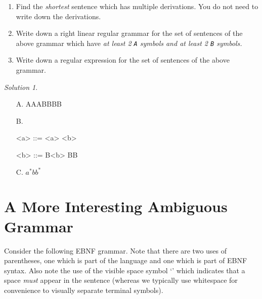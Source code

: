 \documentclass{article}
\theoremstyle{remark} \newtheorem*{solution}{Solution}
\begin{document}
\begin{enumerate}
\item
Find the \textit{shortest} sentence which has multiple
derivations. You do not need to write down the derivations.
\item
Write down a right linear regular grammar for the set of sentences of
the above grammar which have \textit{at least 2 \texttt{A} symbols and
  at least 2 \texttt{B} symbols.}
\item
Write down a regular expression for the set of sentences of the above
grammar.

\end{enumerate}
\begin{mdframed}
    \begin{solution}
        \begin{itemize}
        \indent
            \item [A.]
                AAABBBB
            \item[B.]
             \indent
                \begin{grammar}
                    <a> ::= <a> \alt {}<b>
                    
                    <b> ::= \lit*B<b> \alt \lit*B\lit*B
                \end{grammar}
            \item[C.]
                $a^{*}bb^{*}$
        \end{itemize}
    \end{solution}
\end{mdframed}

\pagebreak
\section{A More Interesting Ambiguous Grammar}

Consider the following EBNF grammar. Note that there are two uses of
parentheses, one which is part of the language and one which is part
of EBNF syntax.  Also note the use of the visible space symbol
`\textvisiblespace' which indicates that a space \textit{must} appear
in the sentence (whereas we typically use whitespace for convenience to visually separate terminal symbols).
\end{document}
